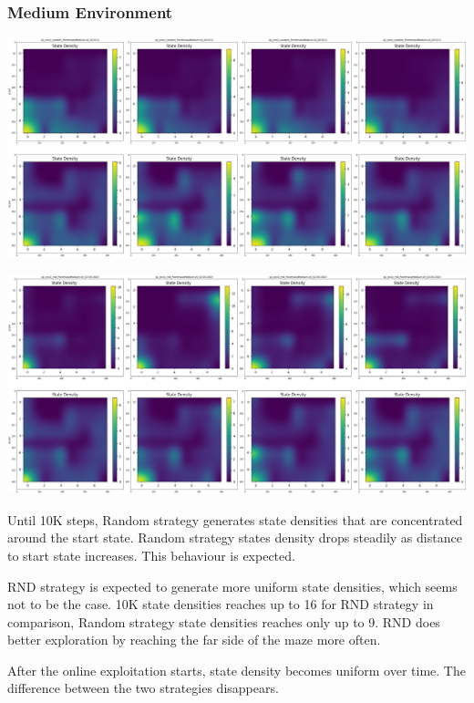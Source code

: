 \documentclass[11pt]{article}
\begin{document}
    \subsubsection{Medium Environment}

    \hspace*{-0.3in}
    \includegraphics[scale=0.20]{p1/q1-medium-state-density-random}

    \hspace*{-0.6in}
    \includegraphics[scale=0.20]{p1/q1-medium-state-density-rnd}

    Until 10K steps, Random strategy generates state densities that are concentrated around the start state.
    Random strategy states density drops steadily as distance to start state increases.
    This behaviour is expected.

    RND strategy is expected to generate more uniform state densities, which seems not to be the case.
    10K state densities reaches up to 16 for RND strategy in comparison, Random strategy state densities reaches only up to 9.
    RND does better exploration by reaching the far side of the maze more often.

    After the online exploitation starts, state density becomes uniform over time.
    The difference between the two strategies disappears.
\end{document}
